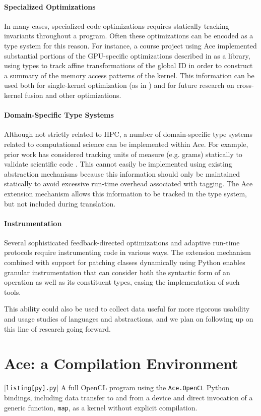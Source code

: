 \documentclass[9pt,preprint]{sigplanconf}
\begin{document}
\paragraph{Specialized Optimizations}
In many cases, specialized code optimizations requires statically tracking invariants throughout a program. Often these optimizations can be encoded as a type system for this reason. For instance, a course project using Ace  implemented substantial portions of the GPU-specific optimizations described in \cite{yang2010gpgpu} as a library, using types to track affine transformations of the global ID in order to construct a summary of the memory access patterns of the kernel. This information can be used both for single-kernel optimization (as in \cite{yang2010gpgpu}) and for future research on cross-kernel fusion and other optimizations.

\paragraph{Domain-Specific Type Systems}
Although not strictly related to HPC, a number of domain-specific type systems related to computational science can be implemented within Ace. For example, prior work has considered tracking units of measure (e.g. grams) statically to validate scientific code \cite{conf/cefp/Kennedy09}. This cannot easily be implemented using existing abstraction mechanisms because this information should only be maintained statically to avoid excessive run-time overhead associated with tagging. The Ace extension mechanism allows this information to be tracked in the type system, but not included during translation.


\paragraph{Instrumentation}
Several sophisticated feedback-directed optimizations and adaptive run-time protocols require instrumenting code in various ways. The extension mechanism combined with support for patching classes dynamically using Python enables granular instrumentation that can consider both the syntactic form of an operation as well as its constituent types, easing the implementation of such tools.

This ability could also be used to collect data useful for more rigorous usability and usage studies of languages and abstractions, and we plan on following up on this line of research going forward.


\section{Ace: a Compilation Environment}\label{compenv}\label{backend}
\begin{codelisting}

\caption{[\texttt{listing\ref{py}.py}] A full OpenCL program using the \texttt{Ace.OpenCL} Python bindings, including data transfer to and from a device and direct invocation of a generic function, \texttt{map}, as a kernel without explicit compilation.}
\label{py}
\end{codelisting}
\end{document}
